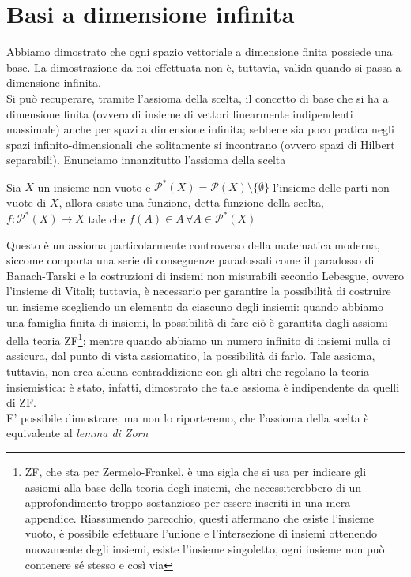 \chapter{Basi a dimensione infinita}

Abbiamo dimostrato che ogni spazio vettoriale a dimensione finita possiede una base. La dimostrazione da noi effettuata non è, tuttavia, valida
quando si passa a dimensione infinita. \\
Si può recuperare, tramite l'assioma della scelta, il concetto di base che si ha a dimensione finita (ovvero di insieme di vettori linearmente indipendenti massimale) anche
per spazi a dimensione infinita; sebbene sia poco pratica negli spazi infinito-dimensionali che solitamente si incontrano (ovvero spazi di Hilbert separabili). Enunciamo innanzitutto l'assioma della scelta

\begin{axiom}
    Sia $X$ un insieme non vuoto e $\mathcal{P}^*(X) = \mathcal{P}(X) \setminus \{ \emptyset \}$ l'insieme delle parti non vuote di $X$, allora esiste una funzione, detta funzione della scelta, $f: \mathcal{P}^*(X) \to X$ tale che $f(A) \in A \, \forall A \in \mathcal{P}^*(X)$ 
\end{axiom}

Questo è un assioma particolarmente controverso della matematica moderna, siccome comporta una serie di conseguenze paradossali come il paradosso di Banach-Tarski e la costruzioni di insiemi non misurabili secondo Lebesgue, ovvero l'insieme di Vitali; tuttavia, è necessario per 
garantire la possibilità di costruire un insieme scegliendo un elemento da ciascuno degli insiemi: quando abbiamo una famiglia finita di insiemi, la possibilità di fare ciò è garantita dagli assiomi della teoria ZF\footnote{ZF, che sta per Zermelo-Frankel, è una sigla che si usa per indicare gli assiomi alla base della teoria degli insiemi, che necessiterebbero di un approfondimento
troppo sostanzioso per essere inseriti in una mera appendice. Riassumendo parecchio, questi affermano che esiste l'insieme vuoto, è possibile effettuare l'unione e l'intersezione di insiemi ottenendo nuovamente degli insiemi, esiste l'insieme singoletto, ogni insieme non può contenere sé stesso e così via}; mentre quando abbiamo un numero infinito di insiemi nulla ci assicura, dal punto di vista
assiomatico, la possibilità di farlo. Tale assioma, tuttavia, non crea alcuna contraddizione con gli altri che regolano la teoria insiemistica: è stato, infatti, dimostrato che tale assioma è indipendente da quelli di ZF. \\
E' possibile dimostrare, ma non lo riporteremo, che l'assioma della scelta è equivalente al \emph{lemma di Zorn}

